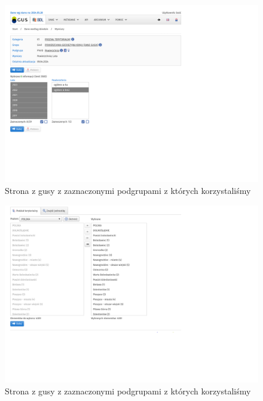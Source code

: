 \documentclass[12pt]{article}
\begin{document}
\begin{figure}[h]
    \caption{Strona z gusy z zaznaczonymi podgrupami z których korzystaliśmy}
    \centering
    \includegraphics[width=1.0\textwidth]{dane3}
\end{figure}
\begin{figure}[h]
    \caption{Strona z gusy z zaznaczonymi podgrupami z których korzystaliśmy}
    \centering
    \includegraphics[width=1.0\textwidth]{dane4}
\end{figure}
\end{document}
